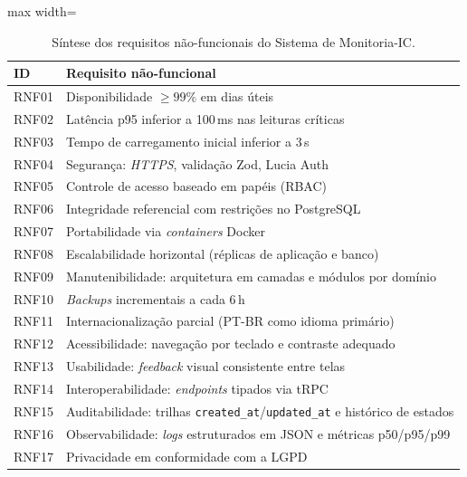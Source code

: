 \documentclass[portuguese]{sbc2025}%
\begin{document}
\begin{table}[!htbp]
  \centering
  \small
  \caption{Síntese dos requisitos não-funcionais do Sistema de Monitoria-IC.}
  \label{tab:rnf-resumo}
  \begin{adjustbox}{max width=\columnwidth}
    \begin{tabular}{|l|p{6.4cm}|}
      \hline
      \textbf{ID} & \textbf{Requisito não-funcional} \\
      \hline
      RNF01 & Disponibilidade $\geq 99\%$ em dias úteis \\ \hline
      RNF02 & Latência p95 inferior a 100\,ms nas leituras críticas \\ \hline
      RNF03 & Tempo de carregamento inicial inferior a 3\,s \\ \hline
      RNF04 & Segurança: \textit{HTTPS}, validação Zod, Lucia Auth \\ \hline
      RNF05 & Controle de acesso baseado em papéis (RBAC) \\ \hline
      RNF06 & Integridade referencial com restrições no PostgreSQL \\ \hline
      RNF07 & Portabilidade via \textit{containers} Docker \\ \hline
      RNF08 & Escalabilidade horizontal (réplicas de aplicação e banco) \\ \hline
      RNF09 & Manutenibilidade: arquitetura em camadas e módulos por domínio \\ \hline
      RNF10 & \textit{Backups} incrementais a cada 6\,h \\ \hline
      RNF11 & Internacionalização parcial (PT-BR como idioma primário) \\ \hline
      RNF12 & Acessibilidade: navegação por teclado e contraste adequado \\ \hline
      RNF13 & Usabilidade: \textit{feedback} visual consistente entre telas \\ \hline
      RNF14 & Interoperabilidade: \textit{endpoints} tipados via tRPC \\ \hline
      RNF15 & Auditabilidade: trilhas \texttt{created\_at}/\texttt{updated\_at} e histórico de estados \\ \hline
      RNF16 & Observabilidade: \textit{logs} estruturados em JSON e métricas p50/p95/p99 \\ \hline
      RNF17 & Privacidade em conformidade com a LGPD \cite{LGPD2018} \\ \hline
    \end{tabular}
  \end{adjustbox}
\end{table}
\end{document}
